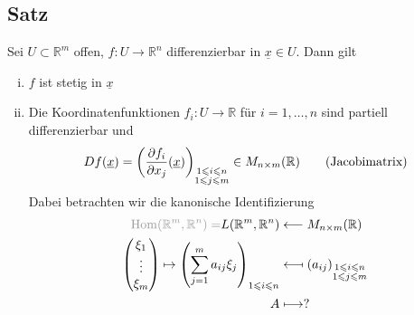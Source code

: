 \subsection[Satz: Differenzierbar impliziert stetig und partiell differenzierbare Koordinatenfunktionen]{Satz} %
\label{sub:74}
Sei $U \subset \mathds{R}^m$ offen, $f : U \to \mathds{R}^n$ differenzierbar in $\underline{x} \in U$. Dann gilt 
\begin{enumerate}[(i)]
	\item $f$ ist stetig in $\underline{x} $
	\item Die Koordinatenfunktionen $f_i : U \to \mathds{R}$ für $i= 1, \ldots , n$ sind partiell differenzierbar und 
	\[
		D f(\underline{x} ) = \enbrace*{\frac{\partial f_i }{\partial x_j} ( \underline{x} ) }_{\substack{1 \le i \le n \\ 1 \le j \le m}} \in M_{n \times m}(\mathds{R})
		\tag{Jacobimatrix}
	\]
	Dabei betrachten wir die kanonische Identifizierung 
	\begin{align*}
		{\color{light_gray}\Hom(\mathds{R}^m, \mathds{R}^n)=} L(\mathds{R}^m, \mathds{R}^n) &\longleftarrow M_{n \times m} (\mathds{R}) \\
		\begin{pmatrix}
			\xi_1 \\ \vdots \\ \xi_m
		\end{pmatrix} \mapsto \enbrace*{\sum_{j=1}^{m} a_{ij} \xi_j}_{1 \le i \le n } &\longmapsfrom (a_{ij})_{\substack{1 \le i \le n \\ 1 \le j \le m}} \\
		A &\longmapsto ?
	\end{align*}
\end{enumerate}
